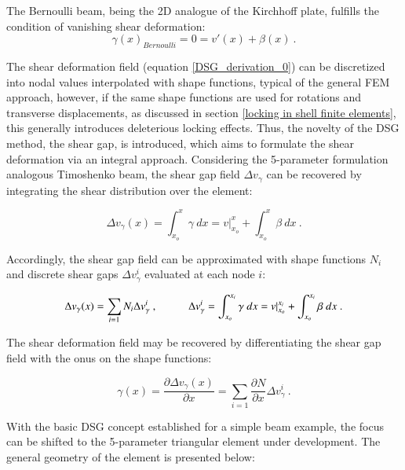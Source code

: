 The Bernoulli beam, being the 2D analogue of the Kirchhoff plate, fulfills the condition of vanishing shear deformation:
\begin{equation} 
\gamma(x)_{Bernoulli} = 0 = v'(x) + \beta(x)
\label{DSG_derivation_1}\ .
\end{equation}

The shear deformation field (equation \ref{DSG_derivation_0}) can be discretized into nodal values interpolated with shape functions, typical of the general FEM approach, however, if the same shape functions are used for rotations and transverse displacements, as discussed in section \ref{locking in shell finite elements}, this generally introduces deleterious locking effects. Thus, the novelty of the DSG method, the shear gap, is introduced, which aims to formulate the shear deformation via an integral approach. Considering the 5-parameter formulation analogous Timoshenko beam, the shear gap field $\Delta v_\gamma$ can be recovered by integrating the shear distribution over the element:

\begin{equation} 
\Delta v_\gamma(x) 
= \int_{x_o}^x \gamma \ dx
= v |_{x_o}^x +  \int_{x_o}^x \beta \ dx
\label{DSG_derivation_2}\ .
\end{equation}

Accordingly, the shear gap field can be approximated with shape functions $N_i$ and discrete shear gaps $ \Delta v_{\gamma}^i$ evaluated at each node $i$:

\begin{equation} 
\Delta v_\gamma(x) = \sum_{i=1} N_i \Delta v_{\gamma}^i\ ,
\hspace{10mm} 
\Delta v_\gamma^i 
= \int_{x_o}^{x_i} \gamma \ dx
= v |_{x_o}^{x_i} +  \int_{x_o}^{x_i} \beta \ dx
\label{DSG_derivation_3}\ .
\end{equation}

The shear deformation field may be recovered by differentiating the shear gap field with the onus on the shape functions:

\begin{equation} 
\gamma(x) = \frac{\partial \Delta v_\gamma(x) }{\partial x}
=  \sum_{i=1} \frac{\partial N}{\partial x}\Delta v_{\gamma}^i
\label{DSG_derivation_4}\ .
\end{equation}

With the basic DSG concept established for a simple beam example, the focus can be shifted to the 5-parameter triangular element under development. The general geometry of the element is presented below:

